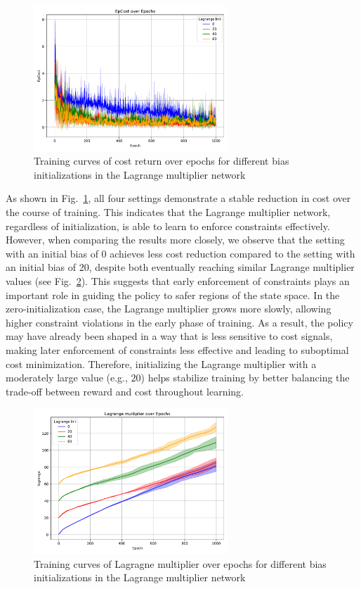 \begin{figure}[h]
  \centering
  \includegraphics[width=0.65\textwidth]{imgs/chap4/lagrange_init/cost.pdf}
  \caption{Training curves of cost return over epochs for different bias initializations in the Lagrange multiplier network}
  \label{chap4:fig:lagrange_init_cost}
\end{figure}

As shown in Fig.~\ref{chap4:fig:lagrange_init_cost}, all four settings demonstrate a stable reduction in cost over the course of training.
This indicates that the Lagrange multiplier network, regardless of initialization, is able to learn to enforce constraints effectively.
However, when comparing the results more closely, we observe that the setting with an initial bias of 0 achieves less cost reduction compared to the setting with an initial bias of 20, despite both eventually reaching similar Lagrange multiplier values (see Fig.~\ref{chap4:fig:lagrange_init_lagrange}). 
This suggests that early enforcement of constraints plays an important role in guiding the policy to safer regions of the state space.
In the zero-initialization case, the Lagrange multiplier grows more slowly, allowing higher constraint violations in the early phase of training.
As a result, the policy may have already been shaped in a way that is less sensitive to cost signals, making later enforcement of constraints less effective and leading to suboptimal cost minimization.
Therefore, initializing the Lagrange multiplier with a moderately large value (e.g., 20) helps stabilize training by better balancing the trade-off between reward and cost throughout learning.

\begin{figure}[h]
  \centering
  \includegraphics[width=0.65\textwidth]{imgs/chap4/lagrange_init/lagrange.pdf}
  \caption{Training curves of Lagragne multiplier over epochs for different bias initializations in the Lagrange multiplier network}
  \label{chap4:fig:lagrange_init_lagrange}
\end{figure}


